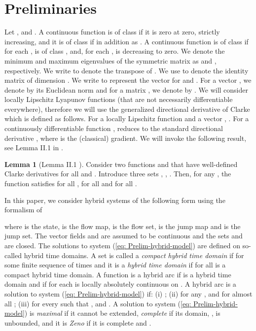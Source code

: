 \documentclass[a4paper, 9pt, twocolumn]{IEEEtran}
\theoremstyle{plain}
\theoremstyle{definition}
\newtheorem{lemma}{Lemma}
\begin{document}
\section{Preliminaries} \label{sec: preliminaries}
Let ,  and . A continuous function  is of class  if it is zero at zero, strictly increasing, and it is of class  if in addition  as . A continuous function  is of class  if for each ,  is of class , and, for each ,  is decreasing to zero. We denote the minimum and maximum eigenvalues of the symmetric matrix  as  and , respectively. We write  to denote the transpose of . We use  to denote the identity matrix of dimension . We write  to represent the vector  for  and . For a vector , we denote by  its Euclidean norm and for a matrix , we denote by . We will consider locally Lipschitz Lyapunov functions (that are not necessarily differentiable everywhere), therefore we will use the generalized directional derivative of Clarke which is defined as follows. For a locally Lipschitz function  and a vector , . For a continuously differentiable function ,  reduces to the standard directional derivative , where  is the (classical) gradient. We will invoke the following result, see Lemma II.1 in \cite{Liberzon2012Lyapunov}.

\begin{lemma}[Lemma II.1 \cite{Liberzon2012Lyapunov}] \label{lma: clarke}
Consider two functions  and  that have well-defined Clarke derivatives for all  and . Introduce three sets , , . Then, for any , the function  satisfies  for all ,  for all  and  for all . \hfill 
\end{lemma}

In this paper, we consider hybrid systems of the following form using the formalism of \cite{Teel}

where  is the state,  is the flow map,  is the flow set,  is the jump map and  is the jump set. The vector fields  and  are assumed to be continuous and the sets  and  are closed. The solutions to system (\ref{eq: Prelim-hybrid-model}) are defined on so-called hybrid time domains. A set  is called a \textit{compact hybrid time domain} if  for some finite sequence of times  and it is a \textit{hybrid time domain} if for all  is a compact hybrid time domain. A function  is a hybrid arc if  is a hybrid time domain and if for each  is locally absolutely continuous on . A hybrid arc  is a solution to system (\ref{eq: Prelim-hybrid-model}) if: (i) ; (ii) for any ,  and  for almost all ; (iii) for every  such that ,  and . A solution  to system (\ref{eq: Prelim-hybrid-model}) is \textit{maximal} if it cannot be extended, \textit{complete} if its domain, , is unbounded, and it is \textit{Zeno} if it is complete and .
\end{document}
